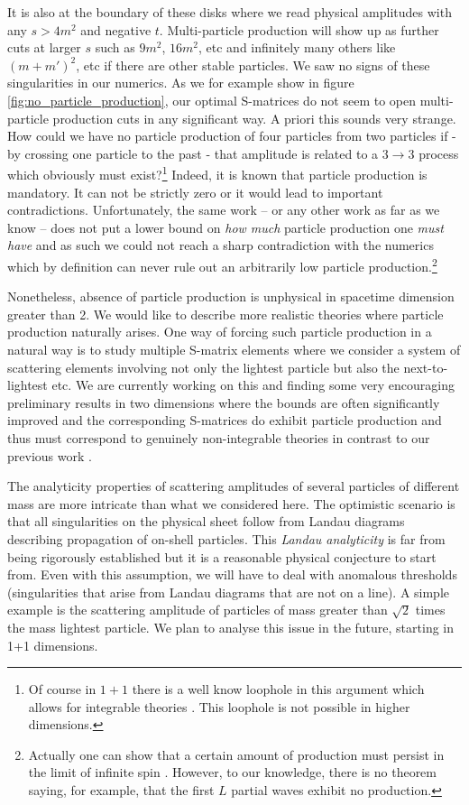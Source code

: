 \documentclass[12pt]{article}
\newcommand{\<}{{\langle}}
\renewcommand{\>}{{\rangle}}
\begin{document}
It is also at the boundary of these disks where we read physical amplitudes with any $s>4m^2$ and negative $t$. Multi-particle production will show up as further cuts at larger $s$ such as $9m^2$, $16m^2$, etc and infinitely many others like $(m+m')^2$, etc if there are other stable particles. 
We saw no signs of these singularities in our numerics. As we for example show in figure \ref{fig:no_particle_production}, our optimal S-matrices do not seem to open multi-particle production cuts in any significant way. A priori this sounds very strange. How could we have no particle production of four particles from two particles if - by crossing one particle to the past - that amplitude is related to a $3\to 3$ process which obviously must exist?\footnote{Of course in $1+1$ there is a well know loophole in this argument which allows for integrable theories \cite{Dorey:1996gd}. This loophole is not possible in higher dimensions.}  Indeed, it is known \cite{Aks} that particle production is mandatory. It can not be strictly zero or it would lead to important contradictions. Unfortunately, the same work \cite{Aks} -- or any other work as far as we know -- does not put a lower bound on \textit{how much} particle production one \textit{must have} and as such we could not reach a sharp contradiction with the numerics which by definition can never rule out an arbitrarily low particle production.\footnote{Actually one can show that a certain amount of production must persist in the limit of infinite spin \cite{Dragt}.  However, to our knowledge, there is no theorem saying, for example, that the first $L$ partial waves exhibit no production.} 

Nonetheless, 
absence of particle production is unphysical in spacetime dimension greater than 2.
We would like to describe more realistic theories where particle production naturally arises. One way of forcing such particle production in a natural way is to study 
multiple S-matrix elements where we consider a system of scattering elements involving not only the lightest particle but also the next-to-lightest etc. We are currently working on this and finding some very encouraging preliminary results in two dimensions where the bounds are often significantly improved and the corresponding S-matrices do exhibit particle production and thus must correspond to genuinely non-integrable theories in contrast to our previous work \cite{paperII}.

The analyticity properties of scattering amplitudes of several particles of different mass are more intricate than what we considered here. The optimistic scenario is that all singularities on the physical sheet follow from Landau diagrams describing propagation of on-shell particles. This \textit{Landau analyticity}  is far from being rigorously established but it is a reasonable physical conjecture to start from. 
Even with this assumption, we will have to deal with anomalous thresholds (singularities that arise from Landau diagrams that are not on a line).
A simple example is the  scattering amplitude of particles of mass greater than $\sqrt{2}$ times the mass lightest particle. 
We plan to analyse this issue in the future, starting in 1+1 dimensions.
\end{document}
